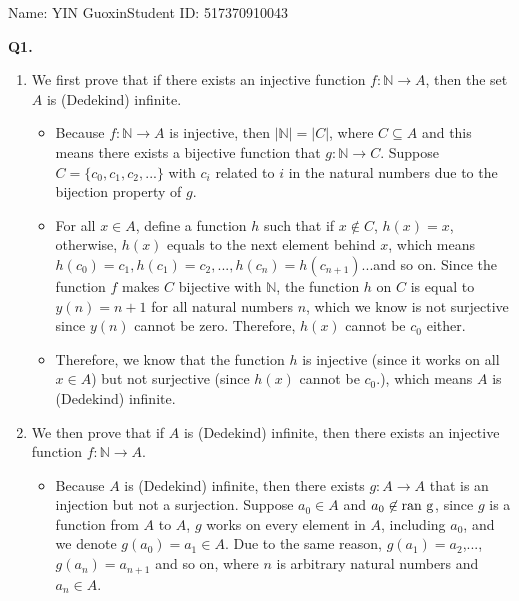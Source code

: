 \documentclass{article}[12pt]
\begin{document}
\noindent

\noindent{}
\begin{center}
\footnotesize{\quad Name: YIN Guoxin\quad Student ID: 517370910043}


\end{center}

\noindent \textbf{Q1.}
\begin{enumerate}
\item We first prove that if there exists an injective function $f:\mathbb{N}\rightarrow A$, then the set $A$ is (Dedekind) infinite.
\begin{itemize}
\item Because $f:\mathbb{N}\rightarrow A$ is injective, then $|\mathbb{N}|=|C|$, where $C\subseteq A$ and this means there exists a bijective function that $g:\mathbb{N}\rightarrow C$. Suppose $C=\{c_0,c_1,c_2,...\}$ with $c_i$ related to $i$ in the natural numbers due to the bijection property of $g$. 
\item For all $x\in A$, define a function $h$ such that if $x\not\in C$, $h(x)=x$, otherwise, $h(x)$ equals to the next element behind $x$, which means $h(c_0)=c_1,h(c_1)=c_2,...,h(c_n)=h(c_{n+1})$...and so on. Since the function $f$ makes $C$ bijective with $\mathbb{N}$, the function $h$ on $C$ is equal to $y(n)=n+1$ for all natural numbers $n$, which we know is not surjective since $y(n)$ cannot be zero. Therefore, $h(x)$ cannot be $c_0$ either.
\item Therefore, we know that the function $h$ is injective (since it works on all $x\in A$) but not surjective (since $h(x)$ cannot be $c_0$.), which means $A$ is (Dedekind) infinite.
\end{itemize}
\item We then prove that if $A$ is (Dedekind) infinite, then there exists an injective function $f:\mathbb{N}\rightarrow A$. 
\begin{itemize}
\item Because $A$ is (Dedekind) infinite, then there exists $g:A\rightarrow A$ that is an injection but not a surjection. Suppose $a_0\in A$ and $a_0\not\in \rm{ran}\ g$, since $g$ is a function from $A$ to $A$, $g$ works on every element in $A$, including $a_0$, and we denote $g(a_0)=a_1\in A$. Due to the same reason, $g(a_1)=a_2$,..., $g(a_n)=a_{n+1}$ and so on, where $n$ is arbitrary natural numbers and $a_n\in A$.

\end{itemize}
\end{enumerate}
\end{document}
